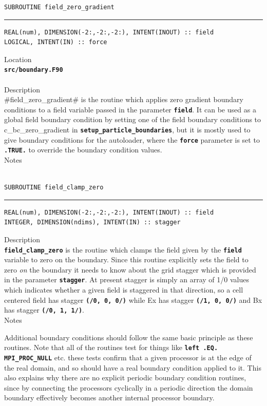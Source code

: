 \documentclass[12pt,a4paper]{article}
\newcommand{\HRule}{\rule{\linewidth}{0.5mm}}
\newcommand{\inlinecode}[1]{{\color{warwickred} \bf\texttt{#1}}}
\newcommand{\codedef}{\begin{Verbatim}[formatcom=\color{warwickred},fontsize=\Large,hfuzz=0pt]}
\newcommand{\coderule}{
{\color{warwickred}\vspace{-0.5cm}\HRule}
\codedef}
\begin{document}
\pagebreak
\codedef
SUBROUTINE field_zero_gradient
\end{Verbatim}
\coderule
REAL(num), DIMENSION(-2:,-2:,-2:), INTENT(INOUT) :: field
LOGICAL, INTENT(IN) :: force
\end{Verbatim}
\vspace{1cm}
{\Large Location\\}
\inlinecode{src/boundary.F90}\\
\\[0.5cm]
{\Large Description\\}
#field_zero_gradient# is the routine which applies zero gradient
boundary conditions to a field variable passed in the parameter
\inlinecode{field}. It can be used as a global field boundary condition by
setting one of the field boundary conditions to c\_bc\_zero\_gradient in
\inlinecode{setup\_particle\_boundaries}, but it is mostly used to give
boundary conditions for the autoloader, where the \inlinecode{force} parameter
is set to \inlinecode{.TRUE.} to override the boundary condition values.
\\[0.5cm]
{\Large Notes\\ \\}

\pagebreak
\codedef
SUBROUTINE field_clamp_zero
\end{Verbatim}
\coderule
REAL(num), DIMENSION(-2:,-2:,-2:), INTENT(INOUT) :: field
INTEGER, DIMENSION(ndims), INTENT(IN) :: stagger
\end{Verbatim}
\vspace{1cm}
{\Large Description\\}
\inlinecode{field\_clamp\_zero} is the routine which clamps the field given by
the \inlinecode{field} variable to zero on the boundary. Since this routine
explicitly sets the field to zero {\it on} the boundary it needs to know about
the grid stagger which is provided in the parameter \inlinecode{stagger}. At
present stagger is simply an array of 1/0 values which indicates whether a
given field is staggered in that direction, so a cell centered field has
stagger \inlinecode{(/0, 0, 0/)} while Ex has stagger \inlinecode{(/1, 0, 0/)} and
Bx has stagger \inlinecode{(/0, 1, 1/)}.
\\[0.5cm]
{\Large Notes\\}
\pagebreak

Additional boundary conditions should follow the same basic principle as these
routines. Note that all of the routines test for things like \inlinecode{left
.EQ. MPI\_PROC\_NULL} etc. these tests confirm that a given processor is at the
edge of the real domain, and so should have a real boundary condition applied
to it. This also explains why there are no explicit periodic boundary condition
routines, since by connecting the processors cyclically in a periodic direction
the domain boundary effectively becomes another internal processor boundary.
\end{document}

